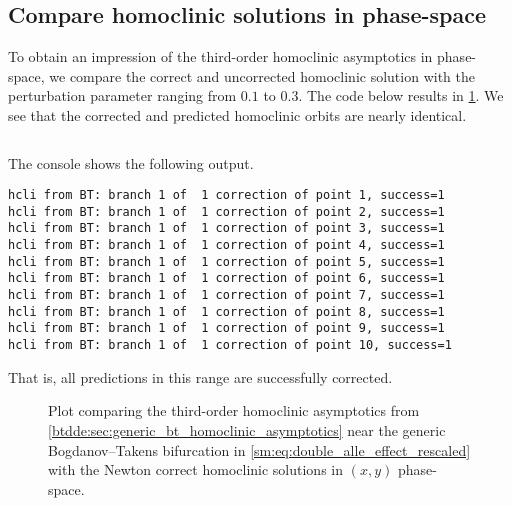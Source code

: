 \subsection{Compare homoclinic solutions in phase-space}
To obtain an impression of the third-order homoclinic asymptotics in
phase-space, we compare the correct and uncorrected homoclinic solution
with the perturbation parameter ranging from $0.1$ to $0.3$.
The code below results in \cref{sm:fig:DoubleAlleeEffectCompareOrbitsPhaseSpace}.
We see that the corrected and predicted homoclinic orbits are nearly identical.
\inputminted[firstline=166, lastline=182]{MATLAB}{\pathToDDEBifToolDemos/predator_prey/predator_prey.m}
The \MATLAB console shows the following output.
\begin{verbatim}
hcli from BT: branch 1 of  1 correction of point 1, success=1
hcli from BT: branch 1 of  1 correction of point 2, success=1
hcli from BT: branch 1 of  1 correction of point 3, success=1
hcli from BT: branch 1 of  1 correction of point 4, success=1
hcli from BT: branch 1 of  1 correction of point 5, success=1
hcli from BT: branch 1 of  1 correction of point 6, success=1
hcli from BT: branch 1 of  1 correction of point 7, success=1
hcli from BT: branch 1 of  1 correction of point 8, success=1
hcli from BT: branch 1 of  1 correction of point 9, success=1
hcli from BT: branch 1 of  1 correction of point 10, success=1
\end{verbatim}
That is, all predictions in this range are successfully corrected.
%
\begin{figure}[ht]
    \centering
    \caption{Plot comparing the third-order homoclinic asymptotics from
    \cref{btdde:sec:generic_bt_homoclinic_asymptotics} near the generic
    Bogdanov--Takens bifurcation in \cref{sm:eq:double_alle_effect_rescaled} with
    the Newton correct homoclinic solutions in $(x,y)$ phase-space.}
    \label{sm:fig:DoubleAlleeEffectCompareOrbitsPhaseSpace}
\end{figure}

